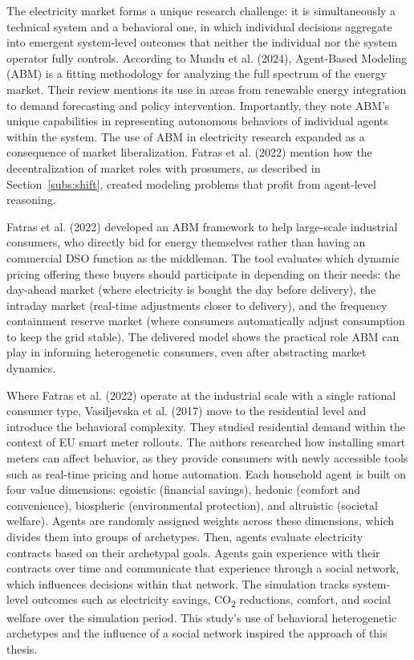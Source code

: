 \documentclass[11pt, a4paper]{article}
\begin{document}
The electricity market forms a unique research challenge: it is simultaneously a technical system and a behavioral one, in which individual decisions aggregate into emergent system-level outcomes that neither the individual nor the system operator fully controls. According to Mundu et al. (2024), Agent-Based Modeling (ABM) is a fitting methodology for analyzing the full spectrum of the energy market. Their review mentions its use in areas from renewable energy integration to demand forecasting and policy intervention. Importantly, they note ABM’s unique capabilities in representing autonomous behaviors of individual agents within the system. The use of ABM in electricity research expanded as a consequence of market liberalization. Fatras et al. (2022) mention how the decentralization of market roles with prosumers, as described in Section~\ref{subs:shift}, created modeling problems that profit from agent-level reasoning. 

Fatras et al. (2022) developed an ABM framework to help large-scale industrial consumers, who directly bid for energy themselves rather than having an commercial DSO function as the middleman. The tool evaluates which dynamic pricing offering these buyers should participate in depending on their needs: the day-ahead market (where electricity is bought the day before delivery), the intraday market (real-time adjustments closer to delivery), and the frequency containment reserve market (where consumers automatically adjust consumption to keep the grid stable). The delivered model shows the practical role ABM can play in informing heterogenetic consumers, even after abstracting market dynamics.

Where Fatras et al. (2022) operate at the industrial scale with a single rational consumer type, Vasiljevska et al. (2017) move to the residential level and introduce the behavioral complexity. They studied residential demand within the context of EU smart meter rollouts. The authors researched how installing smart meters can affect behavior, as they provide consumers with newly accessible tools such as real-time pricing and home automation. Each household agent is built on four value dimensions: egoistic (financial savings), hedonic (comfort and convenience), biospheric (environmental protection), and altruistic (societal welfare). Agents are randomly assigned weights across these dimensions, which divides them into groups of archetypes. Then, agents evaluate electricity contracts based on their archetypal goals. Agents gain experience with their contracts over time and communicate that experience through a social network, which influences decisions within that network. The simulation tracks system-level outcomes such as electricity savings, CO\textsubscript{2} reductions, comfort, and social welfare over the simulation period. This study's use of behavioral heterogenetic archetypes and the influence of a social network inspired the approach of this thesis.
\end{document}
